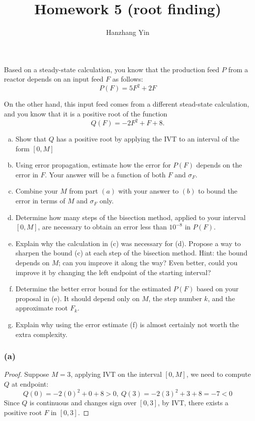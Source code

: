\documentclass{article}
\title{\vspace{-5em}Homework 5 (root finding)}
\author{Hanzhang Yin}
\begin{document}
\maketitle


\begin{problem}
    Based on a steady-state calculation, you know that the production feed \(P\) from a reactor depends on an input feed \(F\) as follows:
    \[P(F) = 5F^2 + 2F\]

    On the other hand, this input feed comes from a different stead-state calculation, and you know that it is a positive root of the function
    \[Q(F) = -2F^2 + F + 8.\]

    \begin{enumerate}[a)]
        \item Show that \(Q\) has a positive root by applying the IVT to an interval of the form \([0,M]\)
        \item Using error propagation, estimate how the error for \(P(F)\) depends on the error in \(F\). Your answer will be a function of both \(F\) and \(\sigma_F\).
        \item Combine your \(M\) from part \((a)\) with your answer to \((b)\) to bound the error in terms of \(M\) and \(\sigma_F\) only. 
        \item Determine how many steps of the bisection method, applied to your interval \([0,M]\), are necessary to obtain an error less than \(10^{-8}\) in \(P(F)\).
        \item Explain why the calculation in (c) was necessary for (d). Propose a way to sharpen the bound (c) at each step of the bisection method. Hint: the bound depends on \(M\); can you improve it along the way? Even better, could you improve it by changing the left endpoint of the starting interval?
        \item Determine the better error bound for the estimated \(P(F)\) based on your proposal in (e). It should depend only on \(M\), the step number \(k\), and the approximate root \(F_k\).
        \item Explain why using the error estimate (f) is almost certainly not worth the extra complexity.
    \end{enumerate}
\end{problem}

\subsubsection*{(a)}
\begin{proof}
    Suppose $M = 3$, applying IVT on the interval $[0, M]$, we need to compute $Q$ at endpoint:
    \[ Q(0) = -2(0)^2 + 0 + 8 > 0, \ Q(3) = -2(3)^2 + 3 + 8 = -7 < 0 \]
    Since $Q$ is continuous and changes sign over $[0,3]$, by IVT, there exists a positive root $F$ in $[0, 3]$.
\end{proof}
\end{document}
